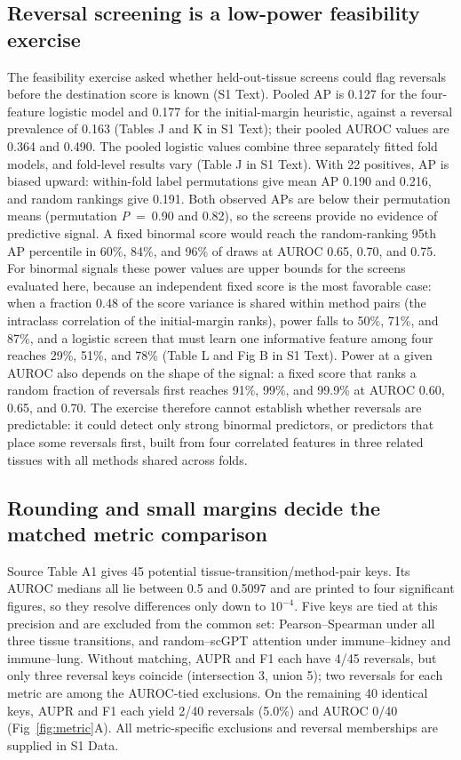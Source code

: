 \documentclass[10pt,letterpaper]{article}
\begin{document}
\subsection*{Reversal screening is a low-power feasibility exercise}
The feasibility exercise asked whether held-out-tissue screens could flag reversals before the destination score is known (S1 Text). Pooled AP is 0.127 for the four-feature logistic model and 0.177 for the initial-margin heuristic, against a reversal prevalence of 0.163 (Tables J and K in S1 Text); their pooled AUROC values are 0.364 and 0.490. The pooled logistic values combine three separately fitted fold models, and fold-level results vary (Table J in S1 Text). With 22 positives, AP is biased upward: within-fold label permutations give mean AP 0.190 and 0.216, and random rankings give 0.191. Both observed APs are below their permutation means (permutation \textit{P}~=~0.90 and 0.82), so the screens provide no evidence of predictive signal. A fixed binormal score would reach the random-ranking 95th AP percentile in 60\%, 84\%, and 96\% of draws at AUROC 0.65, 0.70, and 0.75. For binormal signals these power values are upper bounds for the screens evaluated here, because an independent fixed score is the most favorable case: when a fraction 0.48 of the score variance is shared within method pairs (the intraclass correlation of the initial-margin ranks), power falls to 50\%, 71\%, and 87\%, and a logistic screen that must learn one informative feature among four reaches 29\%, 51\%, and 78\% (Table L and Fig B in S1 Text). Power at a given AUROC also depends on the shape of the signal: a fixed score that ranks a random fraction of reversals first reaches 91\%, 99\%, and 99.9\% at AUROC 0.60, 0.65, and 0.70. The exercise therefore cannot establish whether reversals are predictable: it could detect only strong binormal predictors, or predictors that place some reversals first, built from four correlated features in three related tissues with all methods shared across folds.

\subsection*{Rounding and small margins decide the matched metric comparison}
Source Table A1 gives 45 potential tissue-transition/method-pair keys. Its AUROC medians all lie between 0.5 and 0.5097 and are printed to four significant figures, so they resolve differences only down to $10^{-4}$. Five keys are tied at this precision and are excluded from the common set: Pearson--Spearman under all three tissue transitions, and random--scGPT attention under immune--kidney and immune--lung. Without matching, AUPR and F1 each have 4/45 reversals, but only three reversal keys coincide (intersection 3, union 5); two reversals for each metric are among the AUROC-tied exclusions. On the remaining 40 identical keys, AUPR and F1 each yield 2/40 reversals (5.0\%) and AUROC 0/40 (Fig~\ref{fig:metric}A). All metric-specific exclusions and reversal memberships are supplied in S1 Data.
\end{document}
